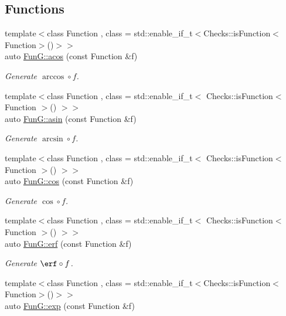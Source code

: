 \subsection*{Functions}
\begin{DoxyCompactItemize}
\item 
{\footnotesize template$<$class Function , class  = std\+::enable\+\_\+if\+\_\+t$<$\+Checks\+::is\+Function$<$\+Function$>$()$>$$>$ }\\auto \hyperlink{group__CMathGroup_gae9b7d3a479bcd8d48cf25f1c29edefb9}{Fun\+G\+::acos} (const Function \&f)
\begin{DoxyCompactList}\small\item\em Generate $ \arccos\circ f $. \end{DoxyCompactList}\item 
{\footnotesize template$<$class Function , class  = std\+::enable\+\_\+if\+\_\+t$<$ Checks\+::is\+Function$<$ Function $>$() $>$$>$ }\\auto \hyperlink{group__CMathGroup_gad26443b289325876cffdaadfca770d51}{Fun\+G\+::asin} (const Function \&f)
\begin{DoxyCompactList}\small\item\em Generate $ \arcsin\circ f $. \end{DoxyCompactList}\item 
{\footnotesize template$<$class Function , class  = std\+::enable\+\_\+if\+\_\+t$<$ Checks\+::is\+Function$<$ Function $>$() $>$$>$ }\\auto \hyperlink{group__CMathGroup_ga7e9b2ac717cd2350663293cb66ba6cbd}{Fun\+G\+::cos} (const Function \&f)
\begin{DoxyCompactList}\small\item\em Generate $ \cos\circ f $. \end{DoxyCompactList}\item 
{\footnotesize template$<$class Function , class  = std\+::enable\+\_\+if\+\_\+t$<$ Checks\+::is\+Function$<$ Function $>$() $>$$>$ }\\auto \hyperlink{group__CMathGroup_gaa0d608a0906520bd48b7e0036e560afa}{Fun\+G\+::erf} (const Function \&f)
\begin{DoxyCompactList}\small\item\em Generate $ \erf\circ f $. \end{DoxyCompactList}\item 
{\footnotesize template$<$class Function , class  = std\+::enable\+\_\+if\+\_\+t$<$\+Checks\+::is\+Function$<$\+Function$>$()$>$$>$ }\\auto \hyperlink{group__CMathGroup_ga00135c8521411f13813f9b972ea4e231}{Fun\+G\+::exp} (const Function \&f)

\end{DoxyCompactItemize}
